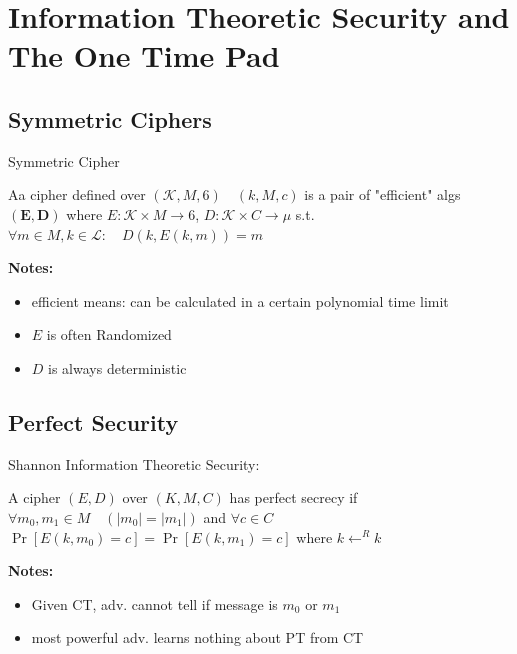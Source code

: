 \section{Information Theoretic Security and The One Time Pad}

\subsection{Symmetric Ciphers}

\begin{definition}  Symmetric Cipher

    Aa cipher defined over $(\mathcal{K}, M, 6) \quad(k, M, c)$ is a pair of "efficient" algs $(\boldsymbol{E}, \boldsymbol{D})$ where 
    $E: \mathcal{K} \times M \rightarrow 6$,  $D: \mathcal{K} \times C \rightarrow \mu$
    s.t. $\forall m \in M, k \in \mathscr{L}: \quad D(k, E(k, m))=m$
    
\end{definition}

\textbf{Notes:}
\begin{itemize} [itemsep=2pt,topsep=0pt,parsep=0pt]
    \item efficient means: can be calculated in a certain polynomial time limit
    \item $E$ is often Randomized
    \item $D$ is always deterministic
\end{itemize}

\subsection{Perfect Security}

\begin{definition}  Shannon Information Theoretic Security:

    A cipher $(E, D)$ over $(K, M, C)$ has perfect secrecy if
    $\forall m_{0}, m_{1} \in M \quad\left(\left|m_{0}\right|=\left|m_{1}\right|\right)$ and $\forall c \in C$
    $\operatorname{Pr}\left[E\left(k, m_{0}\right)=c\right]=\operatorname{Pr}\left[E\left(k, m_{1}\right)=c\right]$ where $k \leftarrow^{R} k$
    
\end{definition}

\textbf{Notes: }
\begin{itemize} [itemsep=2pt,topsep=0pt,parsep=0pt]
    \item Given CT, adv. cannot tell if message is $m_0$ or $m_1$
    \item most powerful adv. learns nothing about PT from CT
\end{itemize}


